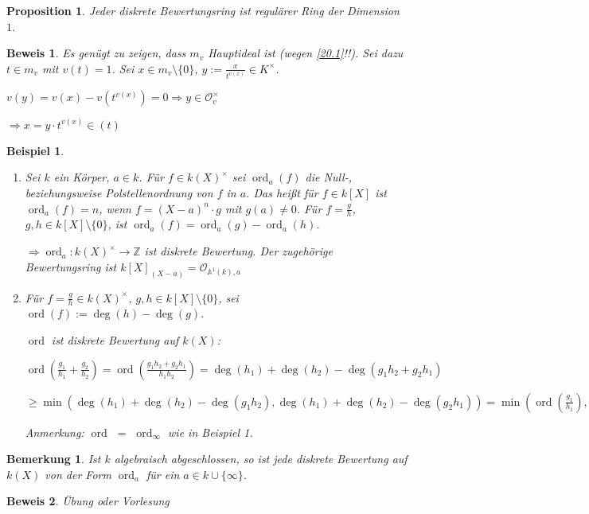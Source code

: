 \documentclass[a4paper, 12pt, numbers=noendperiod, chapterprefix=true]{scrbook}
\theoremstyle{break}
\newtheorem{Bem}[Def]{Bemerkung}
\newtheorem{Prop}[Def]{Proposition}
\theoremstyle{nonumberbreak}
\newtheorem{nnBsp}{Beispiel}
\newtheorem{Bew}{Beweis}
\theoremstyle{nonumberplain}
\newcommand{\quot}[1]{\textrm{\glqq}{#1}\textrm{\grqq}}
\DeclareMathOperator{\ord}{ord}
\newcommand{\Z}{\mathbb{Z}}
\newcommand{\A}{\mathbb{A}}
\newcommand{\calO}{\mathcal{O}}
\begin{document}
\begin{Prop}
Jeder diskrete Bewertungsring ist regul\"arer Ring der Dimension $1$.
\end{Prop}

\begin{Bew}
Es gen\"ugt zu zeigen, dass $m_v$ Hauptideal ist (wegen \ref{20.1}!!). Sei dazu $t\in m_v$ mit $v(t)=1$. Sei $x\in m_v\setminus\{0\}$, $y:=\frac{x}{t^{v(x)}}\in K^\times$.

$v(y)=v(x)-v(t^{v(x)})=0\Rightarrow y\in \calO_v^\times$

$\Rightarrow x=y\cdot t^{v(x)}\in(t)$
\end{Bew}

\begin{nnBsp}\begin{enumerate}[1)]
\item
Sei $k$ ein K\"orper, $a\in k$. F\"ur $f\in k(X)^\times$ sei $\ord_a(f)$ die Null-, beziehungsweise Polstellenordnung von $f$ in $a$. Das hei\ss t f\"ur $f\in k[X]$ ist $\ord_a(f)=n$, wenn $f=(X-a)^n\cdot g$ mit $g(a)\ne0$. F\"ur $f=\frac{g}{h}$, $g,h\in k[X]\setminus\{0\}$, ist $\ord_a(f)=\ord_a(g)-\ord_a(h)$.

$\Rightarrow \ord_a:k(X)^\times\to\Z$ ist diskrete Bewertung. Der zugeh\"orige Bewertungsring ist $k[X]_{(X-a)}=\calO_{\A^1(k),a}$
\item
	F\"ur $f=\frac{g}{h}\in k(X)^\times$, $g,h\in k[X]\setminus\{0\}$, sei $\ord(f):=\deg(h)-\deg(g)$.
	
	$\ord$ ist diskrete Bewertung auf $k(X)$:
	
	$\ord(\frac{g_1}{h_1}+\frac{g_2}{h_2})=\ord(\frac{g_1h_2+g_2h_1}{h_1h_2})=\deg(h_1)+\deg(h_2)-\deg(g_1h_2+g_2h_1)$
	
	$\ge \min(\deg(h_1)+\deg(h_2)-\deg(g_1h_2), \deg(h_1)+\deg(h_2)-\deg(g_2h_1))=\min(\ord(\frac{g_1}{h_1}),\ord(\frac{g_2}{h_2}))$
	
	\emph{Anmerkung:} $\ord$ \quot{$=$} $\ord_\infty$ wie in Beispiel 1.
\end{enumerate}\end{nnBsp}

\begin{Bem}
Ist $k$ algebraisch abgeschlossen, so ist jede diskrete Bewertung auf $k(X)$ von der Form $\ord_a$ f\"ur ein $a\in k\cup\{\infty\}$.
\end{Bem}

\begin{Bew}
\"Ubung oder Vorlesung
\end{Bew}
\end{document}
